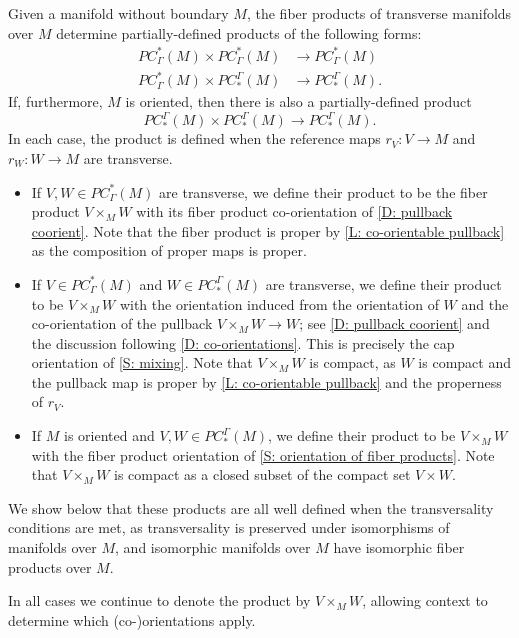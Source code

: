 \begin{definition}\label{D: PC products}
	Given a manifold without boundary $M$, the fiber products of transverse manifolds over $M$ determine partially-defined products of the following forms:
	\begin{align*}
		PC^*_\Gamma(M) \times PC^*_\Gamma(M)& \to PC^*_\Gamma(M)\\
		PC^*_\Gamma(M) \times PC_*^\Gamma(M)& \to PC_*^\Gamma(M).
	\end{align*}
	If, furthermore, $M$ is oriented, then there is also a partially-defined product
	$$PC_*^\Gamma(M) \times PC_*^\Gamma(M) \to PC_*^\Gamma(M).$$
	In each case, the product is defined when the reference maps $r_V \colon V \to M$ and $r_W \colon W \to M$ are transverse.

	\begin{itemize}
		\item If $V,W\in PC^*_\Gamma(M)$ are transverse, we define their product to be the fiber product $V \times_M W$ with its fiber product co-orientation of \cref{D: pullback coorient}.
		Note that the fiber product is proper by \cref{L: co-orientable pullback} as the composition of proper maps is proper.

		\item If $V \in PC^*_\Gamma(M)$ and $W \in PC_*^\Gamma(M)$ are transverse, we define their product to be $V \times_M W$ with the orientation induced from the orientation of $W$ and the co-orientation of the pullback $V \times_M W \to W$; see \cref{D: pullback coorient} and the discussion following \cref{D: co-orientations}.
		This is precisely the cap orientation of \cref{S: mixing}.
		Note that $V \times_M W$ is compact, as $W$ is compact and the pullback map is proper by \cref{L: co-orientable pullback} and the properness of $r_V$.

		\item If $M$ is oriented and $V,W \in PC_*^\Gamma(M)$, we define their product to be $V \times_M W$ with the fiber product orientation of \cref{S: orientation of fiber products}.
		Note that $V \times_M W$ is compact as a closed subset of the compact set $V \times W$.
	\end{itemize}

	We show below that these products are all well defined when the transversality conditions are met, as transversality is preserved under isomorphisms of manifolds over $M$, and isomorphic manifolds over $M$ have isomorphic fiber products over $M$.

	In all cases we continue to denote the product by $V \times_M W$, allowing context to determine which (co\nobreakdash-)orientations apply.
\end{definition}



